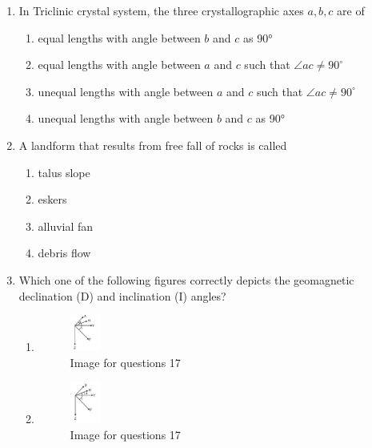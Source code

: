 \documentclass[journal,12pt,onecolumn]{IEEEtran}
\theoremstyle{remark}
\begin{document}
\begin{enumerate}
\item In Triclinic crystal system, the three crystallographic axes \(a, b, c\) are of  
\begin{enumerate}
\item equal lengths with angle between \(b\) and \(c\) as 90°  

\item equal lengths with angle between \( a \) and \( c \) such that \( \angle ac \neq 90^\circ \)  
\item unequal lengths with angle between \( a \) and \( c \) such that \( \angle ac \neq 90^\circ \)
\item unequal lengths with angle between \(b\) and \(c\) as 90°  
\end{enumerate}

\item A landform that results from free fall of rocks is called  
\begin{multicols}{4}
\begin{enumerate}
\item talus slope  
\item eskers  
\item alluvial fan  
\item debris flow  
\end{enumerate}
\end{multicols}

\item Which one of the following figures correctly depicts the geomagnetic declination (D) and inclination (I) angles?  
\begin{multicols}{2}
\begin{enumerate}
\item \begin{figure}[H]
    \centering
    \includegraphics[width=0.1\textwidth]{figs/fig2.png}
    \caption{Image for questions 17}
    \label{fig:question17a}
\end{figure}

\item \begin{figure}[H]
    \centering
    \includegraphics[width=0.1\textwidth]{figs/fig3.png}
    \caption{Image for questions 17}
    \label{fig:question17b}
\end{figure}


\end{enumerate}
\end{multicols}
\end{enumerate}
\end{document}
